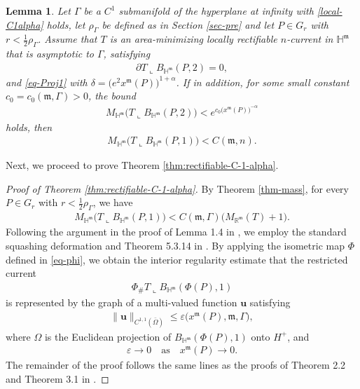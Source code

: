 \documentclass[11pt,reqno]{amsart}
\newcommand{\fm}{\mathfrak{m}}
\renewcommand{\epsilon}{\varepsilon}
\renewcommand{\leq}{\leqslant}
\newtheorem{lemma}[theorem]{Lemma}
\theoremstyle{definition}
\numberwithin{equation}{section}
\begin{document}
\begin{lemma}
 Let $\Gamma$ be a $C^{1}$ submanifold of the hyperplane at infinity with \eqref{local-C1alpha} holds, let $\rho_\Gamma$ be defined as in Section \ref{sec-pre} and let $P\in G_r$ with $r < \tfrac{1}{2}\rho_\Gamma$. Assume that $T$ is an area-minimizing locally rectifiable $n$-current in $\mathbb{H}^\fm$ that is asymptotic to $\Gamma$, satisfying 
\begin{align}
    \partial T \mathbin{\llcorner} B_{\mathbb{H}^\fm}(P, 2) = 0,
\end{align}
and \eqref{eq-Proj1} with $\delta=\bigl(e^2 x^\fm(P)\bigr)^{1+\alpha}$. If in addition, for some small constant $c_0=c_0(\fm, \Gamma)>0$, the bound
\begin{align}
     M_{\mathbb{H}^\fm}\bigl(T \mathbin{\llcorner} B_{\mathbb{H}^\fm}(P, 2)\bigr) < e^{c_0 \bigl(x^\fm(P)\bigr)^{-\alpha}}
\end{align}
holds, then
\begin{align}
    M_{\mathbb{H}^\fm}\bigl(T \mathbin{\llcorner} B_{\mathbb{H}^\fm}(P, 1)\bigr) < C(\fm, n).
\end{align} 
\end{lemma}

Next, we proceed to prove Theorem \ref{thm:rectifiable-C-1-alpha}.

\begin{proof}[Proof of Theorem \ref{thm:rectifiable-C-1-alpha}]
    By Theorem \ref{thm-mass}, for every $P\in G_r$ with $r<\tfrac{1}{2}\rho_\Gamma$, we have
    \begin{align}
        M_{\mathbb{H}^\fm}\bigl(T \mathbin{\llcorner} B_{\mathbb{H}^\fm}(P, 1)\bigr) < C(\fm, \Gamma)\bigl(M_{\mathbb{R}^\fm}(T) +1\bigr).
    \end{align}
    Following the argument in the proof of Lemma 1.4 in \cite{Lin1989CPAM}, we employ the standard squashing deformation and Theorem 5.3.14 in \cite{Federer}. By applying the isometric map $\Phi$ defined in \eqref{eq-phi}, we obtain the interior regularity estimate that the restricted current
    \begin{align}
        \Phi_\# T \mathbin{\llcorner} B_{\mathbb{H}^\fm}(\Phi(P), 1)
    \end{align}
    is represented by the graph of a multi-valued function $\textbf{u}$ satisfying
    \begin{align}
        \|\textbf{u}\|_{C^{1,1}(\bar\Omega)} \leq \epsilon\bigl(x^\fm(P), \fm, \Gamma\bigr),
    \end{align}
    where $\Omega$ is the Euclidean projection of $B_{\mathbb{H}^\fm}(\Phi(P), 1)$ onto $H^+$, and
    \begin{align}
        \epsilon\to 0 \quad \text{as} \quad x^\fm(P) \to 0.
    \end{align}
    The remainder of the proof follows the same lines as the proofs of Theorem 2.2 and Theorem 3.1 in \cite{Hardt&Lin1987}.
\end{proof}
\end{document}

